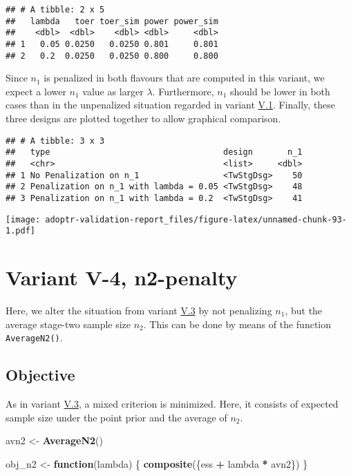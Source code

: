 \documentclass[
]{book}
\newenvironment{Shaded}{\begin{snugshade}}{\end{snugshade}}
\newcommand{\ControlFlowTok}[1]{\textcolor[rgb]{0.13,0.29,0.53}{\textbf{#1}}}
\newcommand{\KeywordTok}[1]{\textcolor[rgb]{0.13,0.29,0.53}{\textbf{#1}}}
\newcommand{\NormalTok}[1]{#1}
\newcommand{\OperatorTok}[1]{\textcolor[rgb]{0.81,0.36,0.00}{\textbf{#1}}}
\newcommand{\StringTok}[1]{\textcolor[rgb]{0.31,0.60,0.02}{#1}}
\begin{document}
\begin{verbatim}
## # A tibble: 2 x 5
##   lambda   toer toer_sim power power_sim
##    <dbl>  <dbl>    <dbl> <dbl>     <dbl>
## 1   0.05 0.0250   0.0250 0.801     0.801
## 2   0.2  0.0250   0.0250 0.800     0.800
\end{verbatim}

Since \(n_1\) is penalized in both flavours that are computed in this variant,
we expect a lower \(n_1\) value as larger \(\lambda\).
Furthermore, \(n_1\) should be lower in both cases than in the unpenalized
situation regarded in variant \protect\hyperlink{variantV_1}{V.1}.
Finally, these three designs are plotted together to allow graphical comparison.

\begin{verbatim}
## # A tibble: 3 x 3
##   type                                   design       n_1
##   <chr>                                  <list>     <dbl>
## 1 No Penalization on n_1                 <TwStgDsg>    50
## 2 Penalization on n_1 with lambda = 0.05 <TwStgDsg>    48
## 3 Penalization on n_1 with lambda = 0.2  <TwStgDsg>    41
\end{verbatim}

\texttt{[image: adoptr-validation-report\_files/figure-latex/unnamed-chunk-93-1.pdf]}

\hypertarget{variantV_4}{%
\section{Variant V-4, n2-penalty}\label{variantV_4}}

Here, we alter the situation from variant \protect\hyperlink{variantV_3}{V.3} by not penalizing
\(n_1\), but the average stage-two sample size \(n_2\).
This can be done by means of the function \texttt{AverageN2()}.

\hypertarget{objective-13}{%
\subsection{Objective}\label{objective-13}}

As in variant \protect\hyperlink{variantV_3}{V.3}, a mixed criterion is minimized.
Here, it consists of expected sample size under the point prior and the
average of \(n_2\).

\begin{Shaded}
\begin{Highlighting}[]
\NormalTok{avn2 \textless{}{-}}\StringTok{ }\KeywordTok{AverageN2}\NormalTok{()}

\NormalTok{obj\_n2 \textless{}{-}}\StringTok{ }\ControlFlowTok{function}\NormalTok{(lambda) \{}
  \KeywordTok{composite}\NormalTok{(\{ess }\OperatorTok{+}\StringTok{ }\NormalTok{lambda }\OperatorTok{*}\StringTok{ }\NormalTok{avn2\})}
\NormalTok{\}}
\end{Highlighting}
\end{Shaded}
\end{document}
